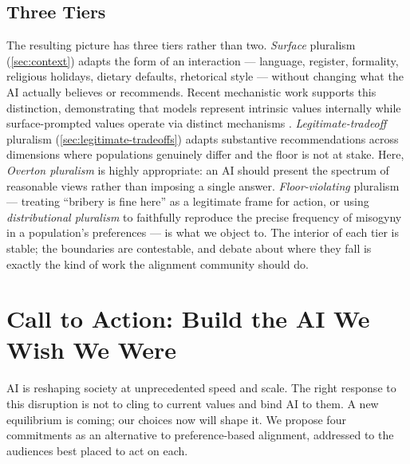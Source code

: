 \documentclass{article}
\theoremstyle{plain}
\theoremstyle{definition}
\theoremstyle{remark}
\begin{document}
\subsection{Three Tiers}
\label{sec:three-tiers}
The resulting picture has three tiers rather than two. \emph{Surface} pluralism (\cref{sec:context}) adapts the form of an interaction --- language, register, formality, religious holidays, dietary defaults, rhetorical style --- without changing what the AI actually believes or recommends. Recent mechanistic work supports this distinction, demonstrating that models represent intrinsic values internally while surface-prompted values operate via distinct mechanisms \citep{han2026dual}. \emph{Legitimate-tradeoff} pluralism (\cref{sec:legitimate-tradeoffs}) adapts substantive recommendations across dimensions where populations genuinely differ and the floor is not at stake. Here, \emph{Overton pluralism} \citep{sorensen2024roadmap} is highly appropriate: an AI should present the spectrum of reasonable views rather than imposing a single answer. \emph{Floor-violating} pluralism --- treating ``bribery is fine here'' as a legitimate frame for action, or using \emph{distributional pluralism} to faithfully reproduce the precise frequency of misogyny in a population's preferences --- is what we object to. The interior of each tier is stable; the boundaries are contestable, and debate about where they fall is exactly the kind of work the alignment community should do.

\section{Call to Action: Build the AI We Wish We Were}
\label{sec:cta}

AI is reshaping society at unprecedented speed and scale. The right response to this disruption is not to cling to current values and bind AI to them. A new equilibrium is coming; our choices now will shape it. We propose four commitments as an alternative to preference-based alignment, addressed to the audiences best placed to act on each.
\end{document}

